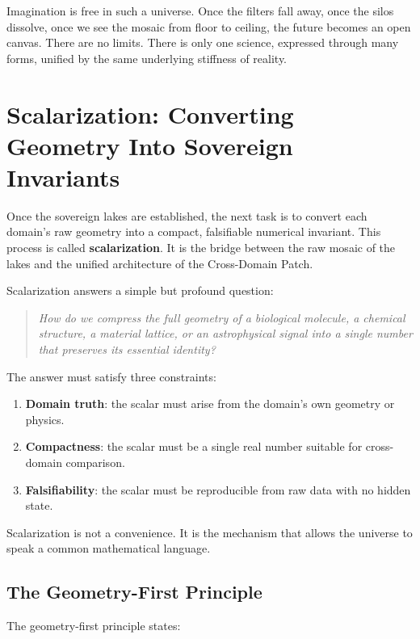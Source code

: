 \documentclass[11pt, letterpaper, openany]{book}
\begin{document}
Imagination is free in such a universe.  
Once the filters fall away, once the silos dissolve, once we see the mosaic from floor to ceiling, the
future becomes an open canvas. There are no limits. There is only one science, expressed through
many forms, unified by the same underlying stiffness of reality.

\chapter{Scalarization: Converting Geometry Into Sovereign Invariants}

Once the sovereign lakes are established, the next task is to convert each domain’s raw geometry
into a compact, falsifiable numerical invariant. This process is called \textbf{scalarization}. It is the
bridge between the raw mosaic of the lakes and the unified architecture of the Cross-Domain Patch.

Scalarization answers a simple but profound question:

\begin{quote}
\textit{How do we compress the full geometry of a biological molecule, a chemical structure, a
material lattice, or an astrophysical signal into a single number that preserves its essential identity?}
\end{quote}

The answer must satisfy three constraints:

\begin{enumerate}
    \item \textbf{Domain truth}: the scalar must arise from the domain’s own geometry or physics.
    \item \textbf{Compactness}: the scalar must be a single real number suitable for cross-domain comparison.
    \item \textbf{Falsifiability}: the scalar must be reproducible from raw data with no hidden state.
\end{enumerate}

Scalarization is not a convenience.  
It is the mechanism that allows the universe to speak a common mathematical language.

\section*{The Geometry-First Principle}
The geometry-first principle states:
\end{document}
